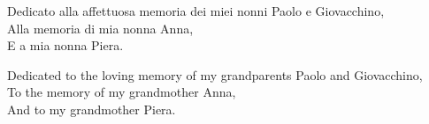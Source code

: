 \thispagestyle{empty}
{}

\vspace*{6cm}



Dedicato alla affettuosa memoria dei miei nonni Paolo e Giovacchino, \\ 
Alla memoria di mia nonna Anna, \\
E a mia nonna Piera.\bigskip
    
Dedicated to the loving memory of my grandparents Paolo and Giovacchino,\\
To the memory of my grandmother Anna,\\
And to my grandmother Piera.

